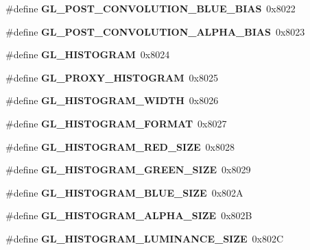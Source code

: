 \begin{DoxyCompactItemize}
\item 
\#define {\bfseries G\+L\+\_\+\+P\+O\+S\+T\+\_\+\+C\+O\+N\+V\+O\+L\+U\+T\+I\+O\+N\+\_\+\+B\+L\+U\+E\+\_\+\+B\+I\+A\+S}~0x8022\label{_s_d_l__opengl_8h_a095942ecfec0da250c326a71fb00db39}

\item 
\#define {\bfseries G\+L\+\_\+\+P\+O\+S\+T\+\_\+\+C\+O\+N\+V\+O\+L\+U\+T\+I\+O\+N\+\_\+\+A\+L\+P\+H\+A\+\_\+\+B\+I\+A\+S}~0x8023\label{_s_d_l__opengl_8h_a194d32b291e6ce5f66c9c0c02d4e01ec}

\item 
\#define {\bfseries G\+L\+\_\+\+H\+I\+S\+T\+O\+G\+R\+A\+M}~0x8024\label{_s_d_l__opengl_8h_adc63b539a0896bef2cab522bc7711947}

\item 
\#define {\bfseries G\+L\+\_\+\+P\+R\+O\+X\+Y\+\_\+\+H\+I\+S\+T\+O\+G\+R\+A\+M}~0x8025\label{_s_d_l__opengl_8h_a2716960c964c19c0f731212a9d87353e}

\item 
\#define {\bfseries G\+L\+\_\+\+H\+I\+S\+T\+O\+G\+R\+A\+M\+\_\+\+W\+I\+D\+T\+H}~0x8026\label{_s_d_l__opengl_8h_ab82a54c12a829fc926927616b64ca8d7}

\item 
\#define {\bfseries G\+L\+\_\+\+H\+I\+S\+T\+O\+G\+R\+A\+M\+\_\+\+F\+O\+R\+M\+A\+T}~0x8027\label{_s_d_l__opengl_8h_add0e20ededc17589551b9b24d07695d4}

\item 
\#define {\bfseries G\+L\+\_\+\+H\+I\+S\+T\+O\+G\+R\+A\+M\+\_\+\+R\+E\+D\+\_\+\+S\+I\+Z\+E}~0x8028\label{_s_d_l__opengl_8h_a7ff8aa546601bfc5ddabd57e3d74e9c9}

\item 
\#define {\bfseries G\+L\+\_\+\+H\+I\+S\+T\+O\+G\+R\+A\+M\+\_\+\+G\+R\+E\+E\+N\+\_\+\+S\+I\+Z\+E}~0x8029\label{_s_d_l__opengl_8h_a255c0a3d5818cb80ba4c74525a62f6f8}

\item 
\#define {\bfseries G\+L\+\_\+\+H\+I\+S\+T\+O\+G\+R\+A\+M\+\_\+\+B\+L\+U\+E\+\_\+\+S\+I\+Z\+E}~0x802\+A\label{_s_d_l__opengl_8h_a5ba7b608a146532635aa3a058c14e67e}

\item 
\#define {\bfseries G\+L\+\_\+\+H\+I\+S\+T\+O\+G\+R\+A\+M\+\_\+\+A\+L\+P\+H\+A\+\_\+\+S\+I\+Z\+E}~0x802\+B\label{_s_d_l__opengl_8h_adfd6f0543d2f48afa4c05d56d9d37748}

\item 
\#define {\bfseries G\+L\+\_\+\+H\+I\+S\+T\+O\+G\+R\+A\+M\+\_\+\+L\+U\+M\+I\+N\+A\+N\+C\+E\+\_\+\+S\+I\+Z\+E}~0x802\+C\label{_s_d_l__opengl_8h_a699154088022f561f7c39b34e535069a}


\end{DoxyCompactItemize}
